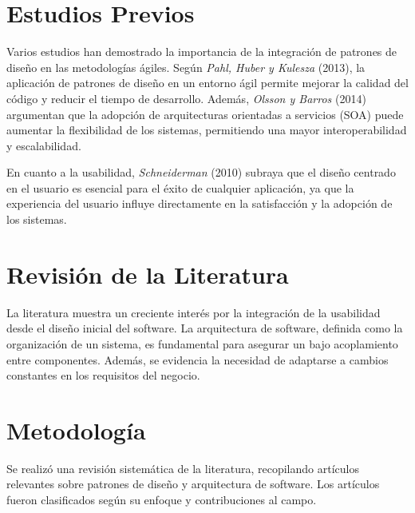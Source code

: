 \documentclass[twocolumn]{article}
\begin{document}
\section{Estudios Previos}
Varios estudios han demostrado la importancia de la integración de patrones de diseño en las metodologías ágiles. Según \textit{Pahl, Huber y Kulesza} (2013), la aplicación de patrones de diseño en un entorno ágil permite mejorar la calidad del código y reducir el tiempo de desarrollo. Además, \textit{Olsson y Barros} (2014) argumentan que la adopción de arquitecturas orientadas a servicios (SOA) puede aumentar la flexibilidad de los sistemas, permitiendo una mayor interoperabilidad y escalabilidad.

En cuanto a la usabilidad, \textit{Schneiderman} (2010) subraya que el diseño centrado en el usuario es esencial para el éxito de cualquier aplicación, ya que la experiencia del usuario influye directamente en la satisfacción y la adopción de los sistemas.
\section{Revisión de la Literatura}
La literatura muestra un creciente interés por la integración de la usabilidad desde el diseño inicial del software. La arquitectura de software, definida como la organización de un sistema, es fundamental para asegurar un bajo acoplamiento entre componentes. Además, se evidencia la necesidad de adaptarse a cambios constantes en los requisitos del negocio.
\section{Metodología}
Se realizó una revisión sistemática de la literatura, recopilando artículos relevantes sobre patrones de diseño y arquitectura de software. Los artículos fueron clasificados según su enfoque y contribuciones al campo.
\end{document}

